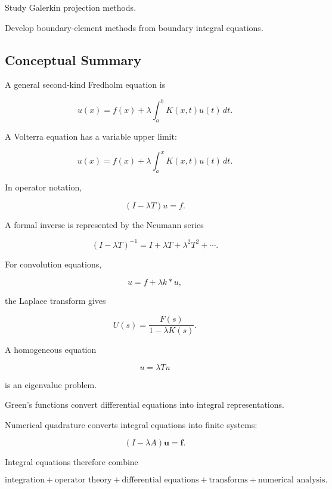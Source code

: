 \begin{exercise}[4]
Study Galerkin projection methods.
\end{exercise}

\begin{exercise}[4]
Develop boundary-element methods from boundary integral equations.
\end{exercise}

\subsection{Conceptual Summary}
\label{subsec:integral-equation-summary}

A general second-kind Fredholm equation is

\[
\boxed{
u(x)
=
f(x)
+
\lambda
\int_a^b
K(x,t)u(t)\,dt.
}
\]

A Volterra equation has a variable upper limit:

\[
\boxed{
u(x)
=
f(x)
+
\lambda
\int_a^x
K(x,t)u(t)\,dt.
}
\]

In operator notation,

\[
\boxed{
(I-\lambda T)u=f.
}
\]

A formal inverse is represented by the Neumann series

\[
\boxed{
(I-\lambda T)^{-1}
=
I+\lambda T+\lambda^2T^2+\cdots.
}
\]

For convolution equations,

\[
\boxed{
u=f+\lambda k*u,
}
\]

the Laplace transform gives

\[
\boxed{
U(s)
=
\frac{
F(s)
}{
1-\lambda K(s)
}.
}
\]

A homogeneous equation

\[
\boxed{
u=\lambda Tu
}
\]

is an eigenvalue problem.

Green's functions convert differential equations into integral
representations.

Numerical quadrature converts integral equations into finite systems:

\[
\boxed{
(I-\lambda A)\mathbf{u}
=
\mathbf{f}.
}
\]

Integral equations therefore combine

\[
\boxed{
\text{integration}
+
\text{operator theory}
+
\text{differential equations}
+
\text{transforms}
+
\text{numerical analysis}.
}
\]

